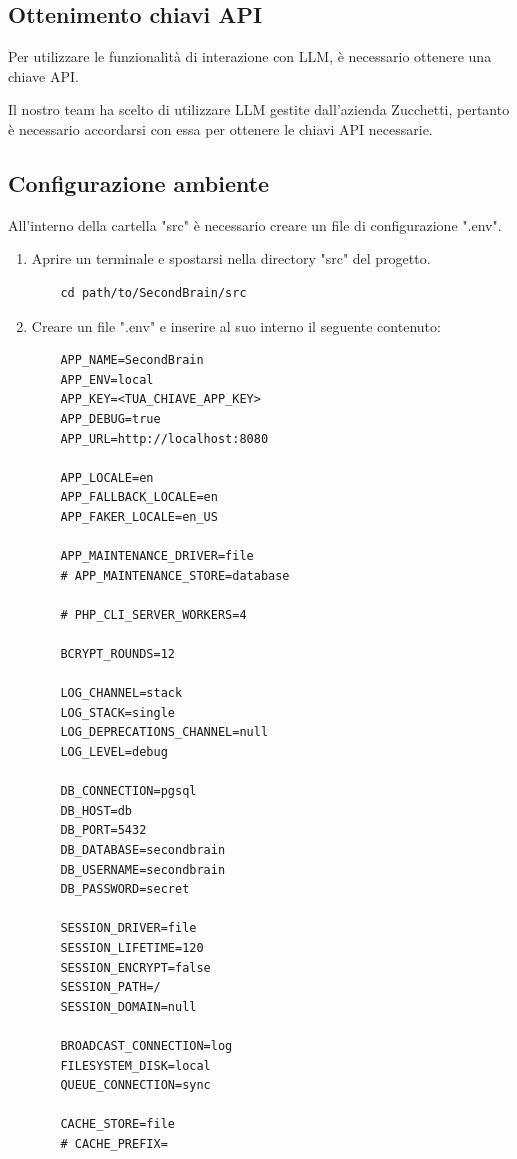 \documentclass[a4paper,10pt]{article}
\begin{document}
\subsection{Ottenimento chiavi API}
Per utilizzare le funzionalità di interazione con LLM, è necessario ottenere una chiave API.

Il nostro team ha scelto di utilizzare LLM gestite dall'azienda Zucchetti, pertanto è necessario accordarsi con essa per ottenere le chiavi API necessarie.

\subsection{Configurazione ambiente}
All'interno della cartella "src" è necessario creare un file di configurazione ".env".
\begin{enumerate}
  \item Aprire un terminale e spostarsi nella directory "src" del progetto.
  
  \begin{lstlisting}
    cd path/to/SecondBrain/src
  \end{lstlisting}

  \item Creare un file ".env" e inserire al suo interno il seguente contenuto:
  
  \begin{lstlisting}
    APP_NAME=SecondBrain
    APP_ENV=local
    APP_KEY=<TUA_CHIAVE_APP_KEY>
    APP_DEBUG=true
    APP_URL=http://localhost:8080

    APP_LOCALE=en
    APP_FALLBACK_LOCALE=en
    APP_FAKER_LOCALE=en_US

    APP_MAINTENANCE_DRIVER=file
    # APP_MAINTENANCE_STORE=database

    # PHP_CLI_SERVER_WORKERS=4

    BCRYPT_ROUNDS=12

    LOG_CHANNEL=stack
    LOG_STACK=single
    LOG_DEPRECATIONS_CHANNEL=null
    LOG_LEVEL=debug

    DB_CONNECTION=pgsql
    DB_HOST=db
    DB_PORT=5432
    DB_DATABASE=secondbrain
    DB_USERNAME=secondbrain
    DB_PASSWORD=secret

    SESSION_DRIVER=file
    SESSION_LIFETIME=120
    SESSION_ENCRYPT=false
    SESSION_PATH=/
    SESSION_DOMAIN=null

    BROADCAST_CONNECTION=log
    FILESYSTEM_DISK=local
    QUEUE_CONNECTION=sync

    CACHE_STORE=file
    # CACHE_PREFIX=


\end{lstlisting}
\end{enumerate}
\end{document}
